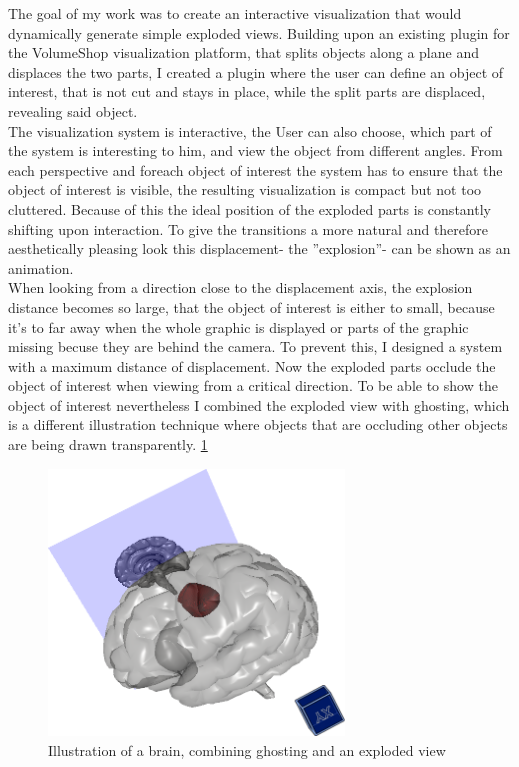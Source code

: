 The goal of my work was to create an interactive visualization that would dynamically generate simple exploded views. Building upon an existing plugin for the VolumeShop visualization platform, that splits objects along a plane and displaces the two parts,  I created a plugin where the user can define an object of interest, that is not cut and stays in place, while the split parts are displaced, revealing said object.\\
The visualization system is interactive, the User can also choose, which part of the system is interesting to him, and view the object from different angles. From each perspective and foreach object of interest the system has to ensure that the object of interest is visible, the resulting visualization is compact but not too cluttered.  Because of this the ideal position of the exploded parts is constantly shifting upon interaction. To give the transitions a more natural and therefore aesthetically pleasing look this displacement- the ''explosion''- can be shown as an animation.\\
When looking from a direction close to the displacement axis, the explosion distance becomes so large, that the object of interest is either to small, because it's to far away when the whole graphic is displayed or parts of the graphic missing becuse they are behind the camera.
To prevent this, I designed a system with a maximum distance of displacement. Now the exploded parts occlude the object of interest when viewing from a critical direction. To be able to show the object of interest nevertheless I combined the exploded view with ghosting, which is a different illustration technique where objects that are occluding other objects are being drawn transparently. \ref{fig:demo}\\
\begin{figure}[tb]
	\centering
	\includegraphics[width=0.7\textwidth]{chapters/figures/demo}
	\caption{Illustration of a brain, combining ghosting and an exploded view}
	\label{fig:demo}
\end{figure}